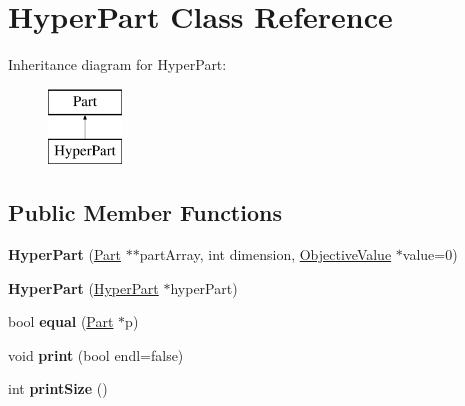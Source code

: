 \hypertarget{classHyperPart}{\section{Hyper\-Part Class Reference}
\label{classHyperPart}
}
Inheritance diagram for Hyper\-Part\-:\begin{figure}[H]
\begin{center}
\leavevmode
\includegraphics[height=2.000000cm]{classHyperPart}
\end{center}
\end{figure}
\subsection*{Public Member Functions}
\begin{DoxyCompactItemize}
\item 
\hypertarget{classHyperPart_afe8afb46a961a23cfcb05a54089cd52f}{{\bfseries Hyper\-Part} (\hyperlink{classPart}{Part} $\ast$$\ast$part\-Array, int dimension, \hyperlink{classObjectiveValue}{Objective\-Value} $\ast$value=0)}\label{classHyperPart_afe8afb46a961a23cfcb05a54089cd52f}

\item 
\hypertarget{classHyperPart_ab3a0e54e5c9d3874daed4d214c093108}{{\bfseries Hyper\-Part} (\hyperlink{classHyperPart}{Hyper\-Part} $\ast$hyper\-Part)}\label{classHyperPart_ab3a0e54e5c9d3874daed4d214c093108}

\item 
\hypertarget{classHyperPart_acfd0161a91999f09dc3f6f6ea871d212}{bool {\bfseries equal} (\hyperlink{classPart}{Part} $\ast$p)}\label{classHyperPart_acfd0161a91999f09dc3f6f6ea871d212}

\item 
\hypertarget{classHyperPart_a3be34de84de996312ad865cec5c647aa}{void {\bfseries print} (bool endl=false)}\label{classHyperPart_a3be34de84de996312ad865cec5c647aa}

\item 
\hypertarget{classHyperPart_a38e7c95cac44dc9048e24ef24e069f07}{int {\bfseries print\-Size} ()}\label{classHyperPart_a38e7c95cac44dc9048e24ef24e069f07}

\end{DoxyCompactItemize}
